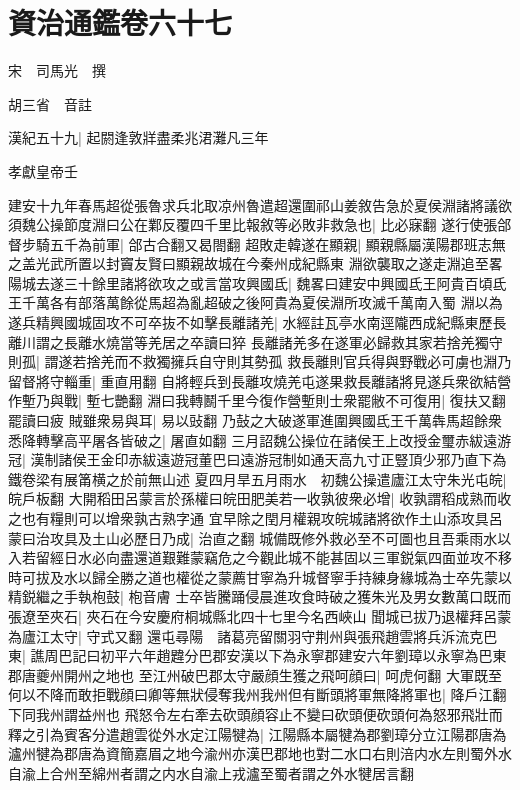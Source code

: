 \section{資治通鑑卷六十七}
宋　司馬光　撰

胡三省　音註

漢紀五十九|{
	起閼逢敦牂盡柔兆涒灘凡三年}


孝獻皇帝壬

建安十九年春馬超從張魯求兵北取凉州魯遣超還圍祁山姜敘告急於夏侯淵諸將議欲須魏公操節度淵曰公在鄴反覆四千里比報敘等必敗非救急也|{
	比必寐翻}
遂行使張郃督步騎五千為前軍|{
	郃古合翻又曷閤翻}
超敗走韓遂在顯親|{
	顯親縣屬漢陽郡班志無之盖光武所置以封竇友賢曰顯親故城在今秦州成紀縣東}
淵欲襲取之遂走淵追至畧陽城去遂三十餘里諸將欲攻之或言當攻興國氐|{
	魏畧曰建安中興國氐王阿貴百頃氐王千萬各有部落萬餘從馬超為亂超破之後阿貴為夏侯淵所攻滅千萬南入蜀}
淵以為遂兵精興國城固攻不可卒抜不如擊長離諸羌|{
	水經註瓦亭水南逕隴西成紀縣東歷長離川謂之長離水燒當等羌居之卒讀曰猝}
長離諸羌多在遂軍必歸救其家若捨羌獨守則孤|{
	謂遂若捨羌而不救獨擁兵自守則其勢孤}
救長離則官兵得與野戰必可虜也淵乃留督將守輜重|{
	重直用翻}
自將輕兵到長離攻燒羌屯遂果救長離諸將見遂兵衆欲結營作塹乃與戰|{
	塹七艷翻}
淵曰我轉鬭千里今復作營塹則士衆罷敝不可復用|{
	復扶又翻罷讀曰疲}
賊雖衆易與耳|{
	易以䜴翻}
乃鼔之大破遂軍進圍興國氐王千萬犇馬超餘衆悉降轉擊高平屠各皆破之|{
	屠直如翻}
三月詔魏公操位在諸侯王上改授金璽赤紱遠游冠|{
	漢制諸侯王金印赤紱遠遊冠董巴曰遠游冠制如通天高九寸正豎頂少邪乃直下為鐵卷梁有展筩横之於前無山述}
夏四月旱五月雨水　初魏公操遣廬江太守朱光屯皖|{
	皖戶板翻}
大開稻田呂蒙言於孫權曰皖田肥美若一收孰彼衆必增|{
	收孰謂稻成熟而收之也有糧則可以增衆孰古熟字通}
宜早除之閏月權親攻皖城諸將欲作土山添攻具呂蒙曰治攻具及土山必歷日乃成|{
	治直之翻}
城備既修外救必至不可圖也且吾乘雨水以入若留經日水必向盡還道艱難蒙竊危之今觀此城不能甚固以三軍鋭氣四面並攻不移時可拔及水以歸全勝之道也權從之蒙薦甘寧為升城督寧手持練身緣城為士卒先蒙以精鋭繼之手執枹鼓|{
	枹音膚}
士卒皆騰踊侵晨進攻食時破之獲朱光及男女數萬口既而張遼至夾石|{
	夾石在今安慶府桐城縣北四十七里今名西峽山}
聞城已拔乃退權拜呂蒙為廬江太守|{
	守式又翻}
還屯尋陽　諸葛亮留關羽守荆州與張飛趙雲將兵泝流克巴東|{
	譙周巴記曰初平六年趙韙分巴郡安漢以下為永寧郡建安六年劉璋以永寧為巴東郡唐夔州開州之地也}
至江州破巴郡太守嚴顔生獲之飛呵顔曰|{
	呵虎何翻}
大軍既至何以不降而敢拒戰顔曰卿等無狀侵奪我州我州但有斷頭將軍無降將軍也|{
	降戶江翻下同我州謂益州也}
飛怒令左右牽去砍頭顔容止不變曰砍頭便砍頭何為怒邪飛壯而釋之引為賓客分遣趙雲從外水定江陽犍為|{
	江陽縣本屬犍為郡劉璋分立江陽郡唐為瀘州犍為郡唐為資簡嘉眉之地今渝州亦漢巴郡地也對二水口右則涪内水左則蜀外水自渝上合州至綿州者謂之内水自渝上戎瀘至蜀者謂之外水犍居言翻}
